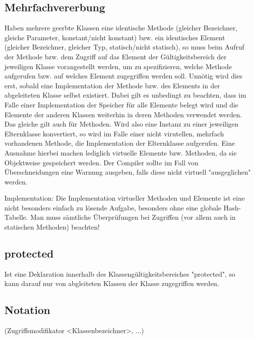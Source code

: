 \subsection{Mehrfachvererbung}
Haben mehrere geerbte Klassen eine identische Methode (gleicher Bezeichner, gleiche Parameter, konstant/nicht konstant) bzw. ein
identisches Element (gleicher Bezeichner, gleicher Typ, statisch/nicht statisch), so
muss beim Aufruf der Methode bzw. dem Zugriff auf das Element der Gültigkeitsbereich der jeweiligen Klasse vorangestellt werden,
um zu spezifizieren, welche Methode aufgerufen bzw. auf welches Element zugegriffen werden soll.
Unnötig wird dies erst, sobald eine Implementation der Methode bzw. des Elements in der abgeleiteten Klasse selbst existiert.
Dabei gilt es unbedingt zu beachten, dass im Falle einer Implementation der Speicher für alle Elemente belegt wird und
die Elemente der anderen Klassen weiterhin in deren Methoden verwendet werden. Das gleiche gilt auch für Methoden.
Wird also eine Instanz zu einer jeweiligen Elternklasse konvertiert, so wird im Falle einer nicht virutellen, mehrfach
vorhandenen Methode, die Implementation der Elternklasse aufgerufen.
Eine Ausnahme hierbei machen lediglich virtuelle Elemente bzw. Methoden, da sie Objektweise gespeichert werden.
Der Compiler sollte im Fall von Überschneidungen eine Warnung ausgeben, falls diese nicht virtuell "ausgeglichen" werden.

Implementation:
Die Implementation virtueller Methoden und Elemente ist eine nicht besonders einfach zu lösende Aufgabe, besonders ohne eine
globale Hash-Tabelle. Man muss sämtliche Überprüfungen bei Zugriffen (vor allem auch in statischen Methoden) beachten!

\subsection{protected}
Ist eine Deklaration innerhalb des Klassengültigkeitsbereiches "protected", so kann darauf nur von abgleiteten Klassen
der Klasse zugegriffen werden.

\subsection{Notation}
(Zugriffsmodifikator <Klassenbezeichner>, ...)

